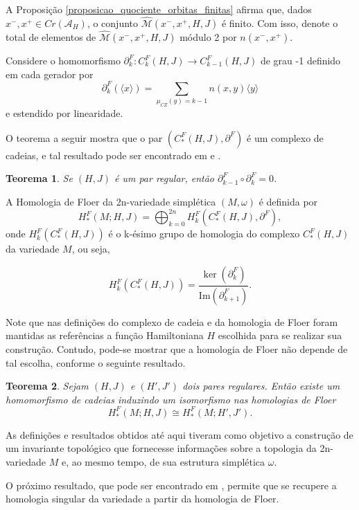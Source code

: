 \documentclass[12pt]{book}
\newtheorem{teorema}{Teorema}[section]
\newcommand{\bordo}[1]{\partial_{#1}}
\newcommand{\energiafinitaM}{\mathcal{M}}
\newcommand{\funcionalH}{\mathcal{A}_{H}}
\newcommand{\gerador}[1]{\langle #1\rangle}
\newcommand{\iconley}[1]{\iconleyabrev(#1)}
\newcommand{\iconleyabrev}{\mu_{CZ}}
\newcommand{\pontoscriticos}[1]{\textit{Cr}(#1)}
\newcommand{\quocientetrajetorias}{\widehat{\energiafinitaM}(x^{-}, x^{+}, H, J)}
\begin{document}
	A Proposição \ref{proposicao_quociente_orbitas_finitas} afirma que, dados $x^{-},x^{+} \in \pontoscriticos{\funcionalH}$, o conjunto $\quocientetrajetorias$ é finito. Com isso, denote o total de elementos de $\quocientetrajetorias$ módulo 2 por $n(x^{-},x^{+})$.
	
	Considere o homomorfismo $\bordo{k}^{F}: C^{F}_{k}(H,J)\to C^{F}_{k-1}(H,J)$ de grau -1 definido em cada gerador por
	$$
	\bordo{k}^{F}(\gerador{x}) = \sum_{\iconley{y}=k-1}n(x,y)\gerador{y}
	$$
	e estendido por linearidade.
	
	O teorema a seguir mostra que o par $(C^{F}_{*}(H,J), \partial^{F})$ é um complexo de cadeias, e tal resultado pode ser encontrado em  \cite{audi_floer_homology} e \cite{salamon_lecture}.
	
	\begin{teorema}
		Se $(H,J)$ é um par regular, então $\partial^{F}_{k-1}\circ \partial^{F}_{k} = 0$.
	\end{teorema}
	
	A Homologia de Floer da 2n-variedade simplética $(M,\omega)$ é definida por 
	$$
		H^{F}_{*}(M;H,J)=\bigoplus_{k=0}^{2n}H^{F}_{k}(C^{F}_{*}(H,J), \partial^{F}),
	$$
	onde $H^{F}_{k}(C^{F}_{*}(H,J))$ é o k-ésimo grupo de homologia do complexo $C^{F}_{*}(H,J)$ da variedade $M$, ou seja,
			
	$$
		H^{F}_{k}(C^{F}_{*}(H,J)) = \frac{\ker(\partial^{F}_{k})}{\text{Im}(\partial^{F}_{k+1})}.
	$$ 
	
	Note que nas definições do complexo de cadeia e da homologia de Floer foram mantidas as referências a função Hamiltoniana $H$ escolhida para se realizar sua construção. Contudo,  pode-se mostrar que a homologia de Floer não depende de tal escolha, conforme o seguinte resultado.
	
	\begin{teorema}
		Sejam $(H,J)$ e $(H',J')$ dois pares regulares. Então existe um homomorfismo de cadeias induzindo um isomorfismo nas homologias de Floer
		$$
		H^{F}_{*}(M;H,J) \cong H^{F}_{*}(M;H',J') . 
		$$
	\end{teorema}
	
	As definições e resultados obtidos até aqui tiveram como objetivo a construção de um invariante topológico que fornecesse informações sobre a topologia da 2n-variedade $M$ e, ao mesmo tempo, de sua estrutura simplética $\omega$.
	
	O próximo resultado, que pode ser encontrado em \cite{salamon_zehnder}, permite que se recupere a homologia singular da variedade a partir da homologia de Floer.
	
\end{document}
